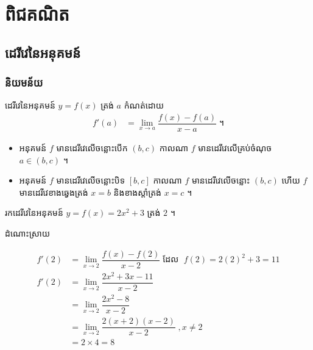 \documentclass[12pt,fleqn]{book} %
\newcommand{\answer}{\begin{center}
\kml \color{magenta} ដំណោះស្រាយ
\end{center}}
\begin{document}
\pagestyle{fancy}



\part{\kml \color{magenta} ពិជគណិត}



\chapter{ដេរីវេនៃអនុគមន៍}
\section{និយមន័យ}
\begin{definition}
ដេរីវេនៃអនុគមន៍ $y=f(x)$ ត្រង់ $a$ កំណត់ដោយ 
\begin{align}\label{def1}
 f'(a)&=\lim _{x\to a}\dfrac{f(x)-f(a)}{x-a} \;\text{។}
 \end{align}
  \end{definition}
\begin{itemize}
\item អនុគមន៍ $f$ មានដេរីវេលើចន្លោះបើក $(b,c)$ កាលណា $f$ មានដេរីវេលើគ្រប់ចំណុច
 $a\in (b,c)$ ។
\item អនុគមន៍ $f$ មានដេរីវេលើចន្លោះបិទ $[b,c]$ កាលណា $f$ មានដេរីវេលើចន្លោះ $(b,c)$ ហើយ $f$
 មានដេរីវេខាងឆ្វេងត្រង់ $x=b$ និងខាងស្តាំត្រង់ $x=c$ ។ 
 \end{itemize}
\begin{example}
រកដេរីវេនៃអនុគមន៍ $y=f(x)=2x^2+3$ ត្រង់ $2$ ។
\end{example}
\answer
\begin{align*}
f'(2)&=\lim_{x\to 2}\dfrac{f(x)-f(2)}{x-2}\; \text{ដែល } \; f(2)=2(2)^2+3=11\\
f'(2)&=\lim_{x\to 2}\dfrac{2x^2+3x-11}{x-2}\\
&=\lim_{x\to 2}\dfrac{2x^2-8}{x-2}\\
&=\lim_{x\to 2}\dfrac{2(x+2)(x-2)}{x-2}\; ,x\neq 2\\
&=2\times 4=8
\end{align*}
\end{document}
